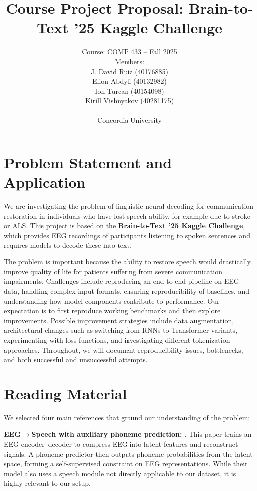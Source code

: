 \documentclass[10pt,twocolumn,letterpaper]{article}
\title{Course Project Proposal: Brain-to-Text '25 Kaggle Challenge}
\author{
Course: COMP 433 -- Fall 2025 \\
Members: \\
J. David Ruiz (40176885) \\
Elion Abdyli (40132982) \\
Ion Turcan (40154098) \\
Kirill Vishnyakov (40281175) \\
\\
Concordia University
}
\begin{document}
\maketitle
\thispagestyle{empty}


\section{Problem Statement and Application}
We are investigating the problem of linguistic neural decoding for communication restoration in individuals who have lost speech ability, for example due to stroke or ALS.  
This project is based on the \textbf{Brain-to-Text '25 Kaggle Challenge}, which provides EEG recordings of participants listening to spoken sentences and requires models to decode these into text.  

The problem is important because the ability to restore speech would drastically improve quality of life for patients suffering from severe communication impairments.  
Challenges include reproducing an end-to-end pipeline on EEG data, handling complex input formats, ensuring reproducibility of baselines, and understanding how model components contribute to performance.  
Our expectation is to first reproduce working benchmarks and then explore improvements.  
Possible improvement strategies include data augmentation, architectural changes such as switching from RNNs to Transformer variants, experimenting with loss functions, and investigating different tokenization approaches.  
Throughout, we will document reproducibility issues, bottlenecks, and both successful and unsuccessful attempts.  

\section{Reading Material}
We selected four main references that ground our understanding of the problem:  

\textbf{EEG$\to$Speech with auxiliary phoneme prediction:} \cite{lee_enhancing_2025}.  
This paper trains an EEG encoder--decoder to compress EEG into latent features and reconstruct signals.  
A phoneme predictor then outputs phoneme probabilities from the latent space, forming a self-supervised constraint on EEG representations.  
While their model also uses a speech module not directly applicable to our dataset, it is highly relevant to our setup.  
\end{document}
